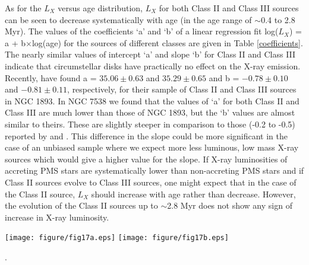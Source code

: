 \documentclass[a4paper,fleqn,usenatbib,useAMS]{mnras}
\begin{document}
As for the $L_X$ versus age distribution, $L_X$ for both Class II and Class III sources can be seen to decrease systematically with
age (in the age range of $\sim$0.4 to 2.8 Myr). The values of the coefficients `a'  and `b' of a 
linear regression fit log($L_X$) = a + b$\times$log(age) for the sources of different classes  are given in Table \ref{coefficients}.
The nearly similar values of intercept `a'  and slope `b' for Class II and Class III indicate that
circumstellar disks have practically no effect on the X-ray emission.
Recently, \citet{2014NewA...29...18P} have found  a = $35.06 \pm0.63$ and $35.29\pm0.65$ and b = $-0.78\pm0.10$ and $-0.81\pm0.11$, 
respectively, for their sample of Class II and Class III sources in NGC 1893. 
In NGC 7538 we found that the values of `a' for both Class II and Class III are much lower than those of NGC 1893,
but the `b' values are almost similar to theirs. 
These are slightly steeper in comparison to those (-0.2 to -0.5) reported by
\citet{2005ApJS..160..390P} and  \citet[$-0.36\pm011$;][]{2007A&A...468..425T}.
This difference in the slope could be more significant 
in the case of an unbiased sample where we expect more less luminous, low mass X-ray sources which would give
a higher value for the slope. If X-ray luminosities of accreting PMS stars are systematically lower than non-accreting PMS
stars \citep[e.g.,][]{2003ApJ...582..382F,2005ApJS..160..401P} and if
Class II sources evolve to Class III sources, one might expect that in the case
of  the Class II source, $L_X$ should increase with age rather than decrease.
However, the evolution of the Class II sources up to $\sim$2.8 Myr does
not show any sign of increase in X-ray luminosity. 


\begin{figure*}
\centering
\centering\texttt{[image: figure/fig17a.eps]}
\centering\texttt{[image: figure/fig17b.eps]}
\caption{\label{spa} (Left-hand panel): Spatial distribution of the YSOs
superimposed on the $15^\prime\times15^\prime$ IRAC  8.0 $\mu$m  image of the NGC 7538 region.
The location of Class I (yellow circles), Class II (red dots), Class III (white dots) and unclassified (blue dots) 
sources are shown along with the $J = 1-0$ line of $^{13}$CO (green contour) and 
850 $\mu$m continuum emission (white contour) taken from \citet{2014MNRAS.439.3719C}.
Also shown are the positions of high-mass dense clumps \citep{2013ApJ...773..102F}  along with the IR sources.
(Right-hand panel): Distributions of the ionized gas as traced by 
radio \citep[1280 MHz, green contours,][]{2004ApJ...616.1042O}  
and by H$\alpha$ emission (white contours) are shown overlaid on the IRAC  8.0 $\mu$m image of the same region.
}. 
\end{figure*}
\end{document}
